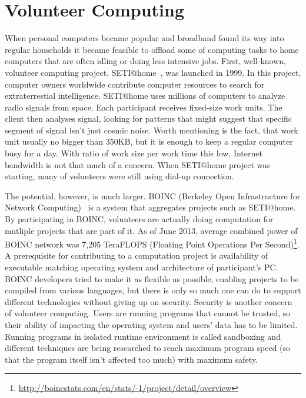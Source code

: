 \section{Volunteer Computing}

\begin{comment}

które seti@home cytować?

seti-experimentInComputing.pdf ?

\end{comment}

When personal computers became popular and broadband found its way into regular households it became feasible to offload some of computing tasks to home computers that are often idling or doing less intensive jobs. First, well-known, volunteer computing project, SETI@home~\cite{anderson2002seti}, was launched in 1999. In this project, computer owners worldwide contribute computer resources to search for extraterrestial intelligence. SETI@home uses millions of computers to analyze radio signals from space. Each participant receives fixed-size work units. The client then analyses signal, looking for patterns that might suggest that specific segment of signal isn't just cosmic noise. Worth mentioning is the fact, that work unit usually no bigger than 350KB, but it is enough to keep a regular computer busy for a day. With ratio of work size per work time this low, Internet bandwidth is not that much of a concern. When SETI@home project was starting, many of volunteers were still using dial-up connection.

\begin{comment}

BOINC
Average FLOPS 2013-06-19: 7,205,094.2 GigaFLOPS / 7,205.094 TeraFLOPS
http://boincstats.com/en/stats/-1/project/detail/overview

\end{comment}

The potential, however, is much larger. BOINC (Berkeley Open Infrastructure for Network Computing)~\cite{anderson2004boinc} is a system that aggregates projects such as SETI@home. By participating in BOINC, volunteers are actually doing computation for mutliple projects that are part of it. As of June 2013, average combined power of BOINC network was 7,205 TeraFLOPS (Floating Point Operations Per Second)\footnote{\url{http://boincstats.com/en/stats/-1/project/detail/overview}}. A prerequisite for contributing to a computation project is availability of executable matching operating system and architecture of participant's PC. BOINC developers tried to make it as flexible as possible, enabling projects to be compiled from various languages, but there is only so much one can do to support different technologies without giving up on security. Security is another concern of volunteer computing. Users are running programs that cannot be trusted, so their ability of impacting the operating system and users' data has to be limited. Running programs in isolated runtime environment is called sandboxing and different techniques are being researched to reach maximum program speed (so that the program itself isn't affected too much) with maximum safety.

